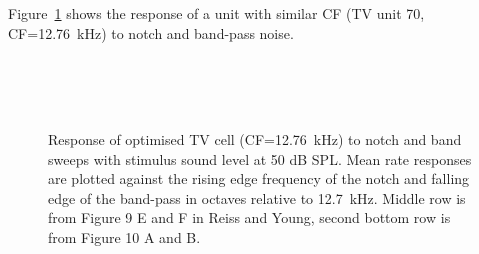 
Figure~\ref{fig:TV_SweepUnit70} shows the response of a unit with similar CF (TV
unit 70, CF=12.76~kHz) to notch and band-pass noise. 

\begin{figure}[h!]
  \centering
  \\
  \\
  \\
  \caption{Response of optimised TV cell (CF=12.76~kHz) to notch and band sweeps with stimulus sound level at 50 dB SPL\@. Mean rate responses are plotted against the rising edge frequency of the notch and falling edge of the band-pass in octaves relative to 12.7~kHz. Middle row is from Figure 9 E and F in Reiss and Young, second bottom row is from Figure 10 A and B. }
  \label{fig:TV_SweepUnit70}
\end{figure}





